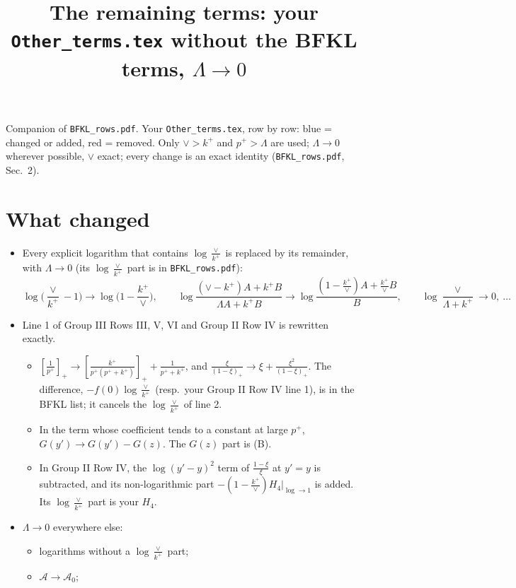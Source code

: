 \documentclass[10pt]{article}
\title{The remaining terms: your \texttt{Other\_terms.tex} without the BFKL terms, $\Lambda\to0$}
\date{}
\numberwithin{equation}{section}
\newcommand{\new}[1]{{\color{blue}#1}}
\newcommand{\old}[1]{{\color{red}#1}}
\begin{document}
\maketitle
\noindent Companion of \texttt{BFKL\_rows.pdf}. Your \texttt{Other\_terms.tex}, row by row: \new{blue} = changed or added, \old{red} = removed. Only $\vee>k^+$ and $p^+>\Lambda$ are used; $\Lambda\to0$ wherever possible, $\vee$ exact; every change is an exact identity (\texttt{BFKL\_rows.pdf}, Sec.~2).

\section{What changed}\label{sec:what}
\begin{itemize}
\item Every explicit logarithm that contains $\log\frac{\vee}{k^+}$ is replaced by its remainder, with $\Lambda\to0$ (its $\log\frac{\vee}{k^+}$ part is in \texttt{BFKL\_rows.pdf}):
\begin{equation*}
\log\Big(\frac{\vee}{k^+}-1\Big)\to\log\Big(1-\frac{k^+}{\vee}\Big),\qquad
\log\frac{(\vee-k^+)A+k^+B}{\Lambda A+k^+B}\to\log\frac{(1-\frac{k^+}{\vee})A+\frac{k^+}{\vee}B}{B},\qquad \log\frac{\vee}{\Lambda+k^+}\to0,\ \dots
\end{equation*}
\item Line 1 of Group III Rows III, V, VI and Group II Row IV is rewritten exactly.
\begin{itemize}
\item $\left[\frac{1}{p^+}\right]_+\to\left[\frac{k^+}{p^+(p^++k^+)}\right]_++\frac{1}{p^++k^+}$, and $\frac{\xi}{(1-\xi)_+}\to\xi+\frac{\xi^2}{(1-\xi)_+}$. The difference, $-f(0)\log\frac{\vee}{k^+}$ (resp.\ your Group II Row IV line 1), is in the BFKL list; it cancels the $\log\frac{\vee}{k^+}$ of line 2.
\item In the term whose coefficient tends to a constant at large $p^+$, $G(y')\to G(y')-G(z)$. The $G(z)$ part is (B).
\item In Group II Row IV, the $\log(y'-y)^2$ term of $\frac{1-\xi}{\xi}$ at $y'=y$ is subtracted, and its non-logarithmic part $-(1-\frac{k^+}{\vee})H_4|_{\log\to1}$ is added. Its $\log\frac{\vee}{k^+}$ part is your $H_4$.
\end{itemize}
\item $\Lambda\to0$ everywhere else:
\begin{itemize}
\item logarithms without a $\log\frac{\vee}{k^+}$ part;
\item $\mathcal A\to\mathcal A_0$;

\end{itemize}
\end{itemize}
\end{document}

